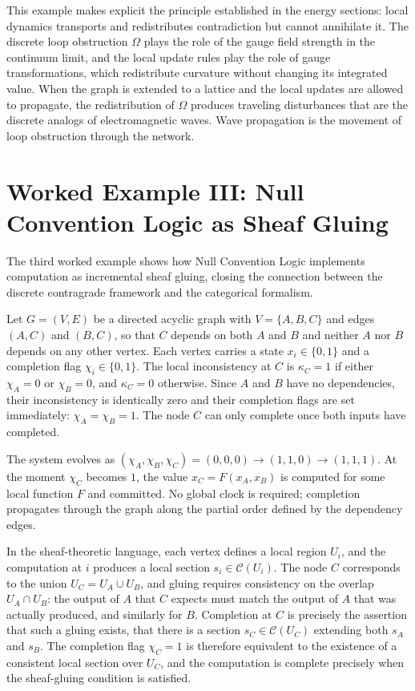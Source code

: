 \documentclass[12pt,a4paper,openany]{book}
\theoremstyle{plain}
\theoremstyle{definition}
\theoremstyle{remark}
\begin{document}
This example makes explicit the principle established in the energy sections: local dynamics transports and redistributes contradiction but cannot annihilate it. The discrete loop obstruction $\Omega$ plays the role of the gauge field strength in the continuum limit, and the local update rules play the role of gauge transformations, which redistribute curvature without changing its integrated value. When the graph is extended to a lattice and the local updates are allowed to propagate, the redistribution of $\Omega$ produces traveling disturbances that are the discrete analogs of electromagnetic waves. Wave propagation is the movement of loop obstruction through the network.

\section{Worked Example III: Null Convention Logic as Sheaf Gluing}

The third worked example shows how Null Convention Logic implements computation as incremental sheaf gluing, closing the connection between the discrete contragrade framework and the categorical formalism.

Let $G = (V, E)$ be a directed acyclic graph with $V = \{A, B, C\}$ and edges $(A, C)$ and $(B, C)$, so that $C$ depends on both $A$ and $B$ and neither $A$ nor $B$ depends on any other vertex. Each vertex carries a state $x_i \in \{0, 1\}$ and a completion flag $\chi_i \in \{0, 1\}$. The local inconsistency at $C$ is $\kappa_C = 1$ if either $\chi_A = 0$ or $\chi_B = 0$, and $\kappa_C = 0$ otherwise. Since $A$ and $B$ have no dependencies, their inconsistency is identically zero and their completion flags are set immediately: $\chi_A = \chi_B = 1$. The node $C$ can only complete once both inputs have completed.

The system evolves as $(\chi_A, \chi_B, \chi_C) = (0, 0, 0) \to (1, 1, 0) \to (1, 1, 1)$. At the moment $\chi_C$ becomes $1$, the value $x_C = F(x_A, x_B)$ is computed for some local function $F$ and committed. No global clock is required; completion propagates through the graph along the partial order defined by the dependency edges.

In the sheaf-theoretic language, each vertex defines a local region $U_i$, and the computation at $i$ produces a local section $s_i \in \mathcal{C}(U_i)$. The node $C$ corresponds to the union $U_C = U_A \cup U_B$, and gluing requires consistency on the overlap $U_A \cap U_B$: the output of $A$ that $C$ expects must match the output of $A$ that was actually produced, and similarly for $B$. Completion at $C$ is precisely the assertion that such a gluing exists, that there is a section $s_C \in \mathcal{C}(U_C)$ extending both $s_A$ and $s_B$. The completion flag $\chi_C = 1$ is therefore equivalent to the existence of a consistent local section over $U_C$, and the computation is complete precisely when the sheaf-gluing condition is satisfied.
\end{document}
